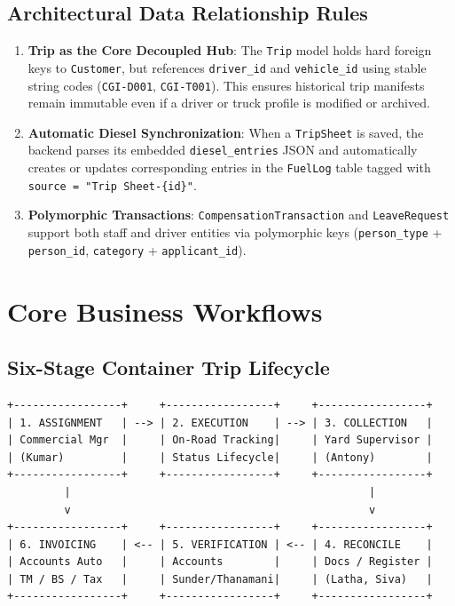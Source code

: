 \documentclass[11pt,a4paper]{article}
\begin{document}
\subsection{Architectural Data Relationship Rules}
\begin{enumerate}[leftmargin=1.4em,itemsep=4pt]
  \item \textbf{Trip as the Core Decoupled Hub}: The \texttt{Trip} model holds hard foreign keys to \texttt{Customer}, but references \texttt{driver\_id} and \texttt{vehicle\_id} using stable string codes (\texttt{CGI-D001}, \texttt{CGI-T001}). This ensures historical trip manifests remain immutable even if a driver or truck profile is modified or archived.
  \item \textbf{Automatic Diesel Synchronization}: When a \texttt{TripSheet} is saved, the backend parses its embedded \texttt{diesel\_entries} JSON and automatically creates or updates corresponding entries in the \texttt{FuelLog} table tagged with \texttt{source = "Trip Sheet-\{id\}"}.
  \item \textbf{Polymorphic Transactions}: \texttt{CompensationTransaction} and \texttt{LeaveRequest} support both staff and driver entities via polymorphic keys (\texttt{person\_type} + \texttt{person\_id}, \texttt{category} + \texttt{applicant\_id}).
\end{enumerate}

\section{Core Business Workflows}

\subsection{Six-Stage Container Trip Lifecycle}
\begin{lstlisting}[style=asciiart]
+-----------------+     +-----------------+     +-----------------+
| 1. ASSIGNMENT   | --> | 2. EXECUTION    | --> | 3. COLLECTION   |
| Commercial Mgr  |     | On-Road Tracking|     | Yard Supervisor |
| (Kumar)         |     | Status Lifecycle|     | (Antony)        |
+-----------------+     +-----------------+     +-----------------+
         |                                               |
         v                                               v
+-----------------+     +-----------------+     +-----------------+
| 6. INVOICING    | <-- | 5. VERIFICATION | <-- | 4. RECONCILE    |
| Accounts Auto   |     | Accounts        |     | Docs / Register |
| TM / BS / Tax   |     | Sunder/Thanamani|     | (Latha, Siva)   |
+-----------------+     +-----------------+     +-----------------+
\end{lstlisting}
\end{document}
